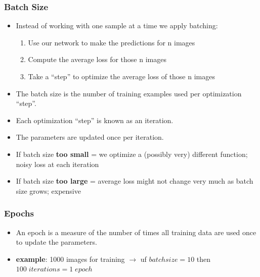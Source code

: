 \documentclass[11pt]{article}
\begin{document}
\subsubsection{Batch Size}
\begin{itemize}
\item Instead of working with one sample at a time we apply batching:
\begin{enumerate}
\item Use our network to make the predictions for n images
\item Compute the average loss for those n images
\item Take a “step” to optimize the average loss of those n images
\end{enumerate}
\item The batch size is the number of training examples used per optimization “step”.
\item Each optimization “step” is known as an iteration.
\item The parameters are updated once per iteration.
\item If batch size\textbf{ too small} = we optimize a (possibly very) different function; noisy
loss at each iteration
\item If batch size \textbf{too large} = average loss might not change very much as batch size grows; expensive
\end{itemize}
\subsubsection{Epochs}
\begin{itemize}
\item An epoch is a measure of the number of times all training data are used once to update the parameters.
\item \textbf{example}: 1000 images for training $\rightarrow$ uf $batchsize = 10$ then $100 \; iterations = 1 \; epoch$
\end{itemize}
\end{document}
